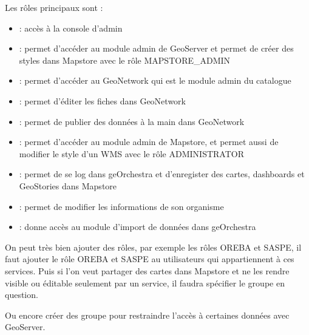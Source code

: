 \documentclass[letterpaper,10pt,french]{sphinxmanual}
\begin{document}
\sphinxAtStartPar
Les rôles principaux sont :
\begin{itemize}
\item {} 
\sphinxAtStartPar
{} : accès à la console d’admin

\item {} 
\sphinxAtStartPar
{} : permet d’accéder au module admin de GeoServer et permet de créer des styles dans Mapstore avec le rôle MAPSTORE\_ADMIN

\item {} 
\sphinxAtStartPar
{} : permet d’accéder au GeoNetwork qui est le module admin du catalogue

\item {} 
\sphinxAtStartPar
{} : permet d’éditer les fiches dans GeoNetwork

\item {} 
\sphinxAtStartPar
{} : permet de publier des données à la main dans GeoNetwork

\item {} 
\sphinxAtStartPar
{} : permet d’accéder au module admin de Mapstore, et permet aussi de modifier le style d’un WMS avec le rôle ADMINISTRATOR

\item {} 
\sphinxAtStartPar
{} : permet de se log dans geOrchestra et d’enregister des cartes, dashboards et GeoStories dans Mapstore

\item {} 
\sphinxAtStartPar
{} : permet de modifier les informations de son organisme

\item {} 
\sphinxAtStartPar
{} : donne accès au module d’import de données dans geOrchestra

\end{itemize}

\sphinxAtStartPar
On peut très bien ajouter des rôles, par exemple les rôles OREBA et SASPE, il faut ajouter le rôle OREBA et SASPE au utilisateurs qui appartiennent à ces services.
Puis si l’on veut partager des cartes dans Mapstore et ne les rendre visible ou éditable seulement par un service, il faudra spécifier le groupe en question.

\sphinxAtStartPar
Ou encore créer des groupe pour restraindre l’accès à certaines données avec GeoServer.
\end{document}
